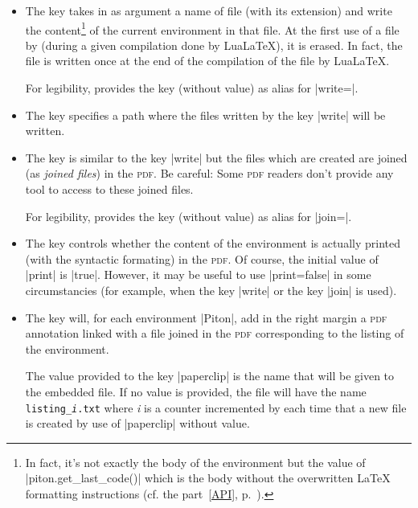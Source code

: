 \documentclass{article}
\begin{document}
\bigskip
\begin{itemize}
\item {} The key  takes in as argument a name of
file (with its extension) and write the content\footnote{In fact, it's not
exactly the body of the environment but the value of |piton.get_last_code()|
which is the body without the overwritten LaTeX formatting instructions (cf.
the part~\ref{API}, p.~\pageref{API}).} of the current environment in
that file. At the first use of a file by  (during a given
compilation done by LuaLaTeX), it is erased. In fact, the file is written once at
the end of the compilation of the file by LuaLaTeX.

For legibility,  provides the key  (without value)
as alias for |write={}|.

\item {} The key  specifies a path
where the files written by the key |write| will be written.

\item {}

The key  is similar to the key |write| but the files which
are created are joined (as \emph{joined files}) in the \textsc{pdf}. Be
careful: Some \textsc{pdf} readers don't provide any tool to access to these
joined files.

For legibility,  provides the key  (without value)
as alias for |join={}|.

\item {}
The key  controls whether the content of the environment is 
actually printed (with the syntactic formating) in the \textsc{pdf}. Of
course, the initial value of |print| is |true|. However, it may be useful to
use |print=false| in some circumstancies (for example, when the key |write| or
the key |join| is used).

\item {}
The key  will, for each environment |{Piton}|, add in the right
margin a \textsc{pdf} annotation linked with a file joined in the \textsc{pdf}
corresponding to the listing of the environment.

The value provided to the key |paperclip| is the name that will be given to the embedded
file. If no value is provided, the file will have the name \texttt{listing_\textsl{i}.txt}
where \textsl{i} is a counter incremented by  each time that a new file is
created by use of |paperclip| without value.


\end{itemize}
\end{document}
